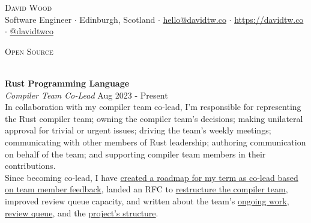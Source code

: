\documentclass[a4paper]{article}
\newcommand{\lineunder} {
  \vspace*{-8pt} \\
  \hspace*{-18pt} \hrulefill \\
}
\newcommand{\header} [1] {
  {\hspace*{-18pt}\vspace*{6pt} \textsc{#1}}
  \vspace*{-6pt} \lineunder
}
\begin{document}
\fancyhead{}
\renewcommand{\headrulewidth}{0pt}

\fancyfoot{}
\fancyfoot[R]{\scriptsize\scshape\color{gray} \thepage}

\vspace*{-40pt}

\vspace*{-10pt}
\begin{center}
  {\Huge \scshape {David Wood}} \\
  \vspace{2mm}
  Software Engineer $\cdot$
  Edinburgh, Scotland $\cdot$
  \href{mailto:hello@davidtw.co}{hello@davidtw.co} $\cdot$
  \href{https://davidtw.co}{https://davidtw.co} $\cdot$
  \href{https://github.com/davidtwco}{@davidtwco} \\
\end{center}

\header{Open Source}
\vspace{1mm}

\textbf{Rust Programming Language} \\
\textit{Compiler Team Co-Lead} \hfill {\color{gray} Aug 2023 - Present} \\
\vspace{2mm}
In collaboration with my compiler team co-lead, I'm responsible for representing the Rust
compiler team; owning the compiler team's decisions; making unilateral approval for trivial or
urgent issues; driving the team's weekly meetings; communicating with other members of Rust
leadership; authoring communication on behalf of the team; and supporting compiler team members in
their contributions. \\
\vspace{2mm}
Since becoming co-lead, I have \href{https://borrowed.dev/p/priorities-plans-and-backlogs}{created a
roadmap for my term as co-lead based on team member feedback}, landed an RFC to
\href{https://github.com/rust-lang/rfcs/pull/3599}{restructure the compiler team}, improved review
queue capacity, and written about the team's
\href{https://borrowed.dev/p/on-ongoing-work-in-the-rust-compiler-team}{ongoing work},
\href{https://borrowed.dev/p/priorities-plans-and-backlogs}{review queue}, and the
\href{https://borrowed.dev/p/priorities-plans-and-backlogs}{project's structure}.
\vspace{2mm}
\end{document}
